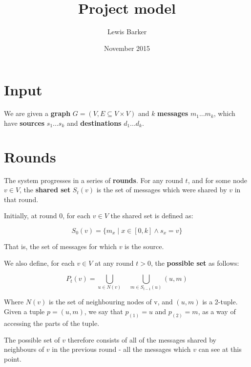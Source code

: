 \documentclass{article}
\begin{document}
\author{Lewis Barker}
\title{Project model}
\date{November 2015}
\maketitle

\section{Input}
We are given a \textbf{graph} $G = (V, E \subseteq V \times V)$ and $k$ \textbf{messages} $ m_{1} ... m_{k}$, which have \textbf{sources} $s_{1} ... s_{k}$ and \textbf{destinations} $d_{1} ... d_{k}$.

\section{Rounds}
The system progresses in a series of \textbf{rounds}. For any round $t$, and for some node $v \in V$, the \textbf{shared set} $S_{t}(v)$ is the set of messages which were shared by $v$ in that round.

Initially, at round 0, for each $v \in V$ the shared set is defined as:

\begin{equation}
S_{0}(v) = \{m_{x} \; | \; x \in [0, k] \wedge s_{x} = v\}
\end{equation}

That is, the set of messages for which $v$ is the source.

We also define, for each $v \in V$ at any round $t > 0$, the \textbf{possible set} as follows:

\begin{equation}
P_{t}(v) = \bigcup_{u \in N(v)} \quad \bigcup_{m \in S_{t-1}(u)} (u, m)
\end{equation}

Where $N(v)$ is the set of neighbouring nodes of v, and $(u, m)$ is a 2-tuple. Given a tuple $p = (u, m)$, we say that $p_{(1)} = u$ and $p_{(2)} = m$, as a way of accessing the parts of the tuple.

The possible set of $v$ therefore consists of all of the messages shared by neighbours of $v$ in the previous round - all the messages which $v$ can see at this point.
\end{document}
